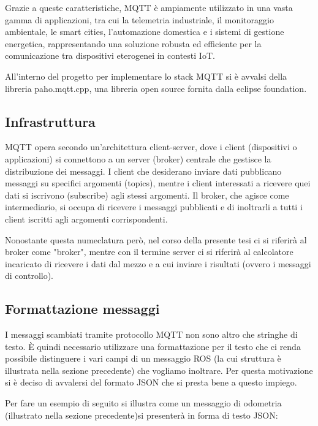 \noindent Grazie a queste caratteristiche, MQTT è ampiamente utilizzato in una vasta gamma di applicazioni, tra cui la telemetria industriale, il monitoraggio ambientale, le smart cities, l'automazione domestica e i sistemi di gestione energetica, rappresentando una soluzione robusta ed efficiente per la comunicazione tra dispositivi eterogenei in contesti IoT.

\noindent All'interno del progetto per implementare lo stack MQTT si è avvalsi della libreria paho.mqtt.cpp, una libreria open source fornita dalla eclipse foundation.

\subsection{Infrastruttura}
\noindent MQTT opera secondo un'architettura client-server, dove i client (dispositivi o applicazioni) si connettono a un server (broker) centrale che gestisce la distribuzione dei messaggi. I client che desiderano inviare dati pubblicano messaggi su specifici argomenti (topics), mentre i client interessati a ricevere quei dati si iscrivono (subscribe) agli stessi argomenti. Il broker, che agisce come intermediario, si occupa di ricevere i messaggi pubblicati e di inoltrarli a tutti i client iscritti agli argomenti corrispondenti.

\noindent Nonostante questa numeclatura però, nel corso della presente tesi ci si riferirà al broker come "broker", mentre con il termine server ci si riferirà al calcolatore incaricato di ricevere i dati dal mezzo e a cui inviare i risultati (ovvero i messaggi di controllo).

\subsection{Formattazione messaggi}
I messaggi scambiati tramite protocollo MQTT non sono altro che stringhe di testo. È quindi necessario utilizzare una formattazione per il testo che ci renda possibile distinguere i vari campi di un messaggio ROS (la cui struttura è illustrata nella sezione precedente) che vogliamo inoltrare. Per questa motivazione si è deciso di avvalersi del formato JSON che si presta bene a questo impiego.

\noindent Per fare un esempio di seguito si illustra come un messaggio di odometria (illustrato nella sezione precedente)si presenterà in forma di testo JSON:



